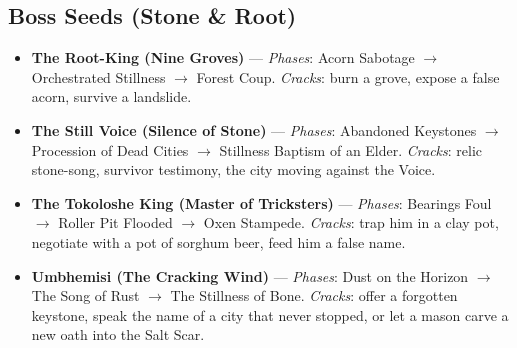 \subsection*{Boss Seeds (Stone \& Root)}
\begin{itemize}
\item \textbf{The Root-King (Nine Groves)} --- \emph{Phases}: Acorn Sabotage $\rightarrow$ Orchestrated Stillness $\rightarrow$ Forest Coup. \emph{Cracks}: burn a grove, expose a false acorn, survive a landslide.
\item \textbf{The Still Voice (Silence of Stone)} --- \emph{Phases}: Abandoned Keystones $\rightarrow$ Procession of Dead Cities $\rightarrow$ Stillness Baptism of an Elder. \emph{Cracks}: relic stone-song, survivor testimony, the city moving against the Voice.
\item \textbf{The Tokoloshe King (Master of Tricksters)} --- \emph{Phases}: Bearings Foul $\rightarrow$ Roller Pit Flooded $\rightarrow$ Oxen Stampede. \emph{Cracks}: trap him in a clay pot, negotiate with a pot of sorghum beer, feed him a false name.
\item \textbf{Umbhemisi (The Cracking Wind)} --- \emph{Phases}: Dust on the Horizon $\rightarrow$ The Song of Rust $\rightarrow$ The Stillness of Bone. \emph{Cracks}: offer a forgotten keystone, speak the name of a city that never stopped, or let a mason carve a new oath into the Salt Scar.
\end{itemize}

